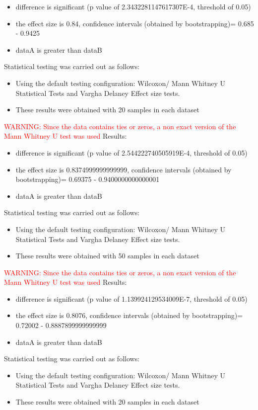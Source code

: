 \documentclass[]{article}
\begin{document}
\begin{itemize}
\item{difference is significant (p value of 2.3432281147617307E-4, threshold of 0.05)}
\item{the effect size is 0.84, confidence intervals (obtained by bootstrapping)= 0.685 - 0.9425}
\item{dataA is greater than dataB}
\end{itemize}Statistical testing was carried out as follows: \begin{itemize}
\item{Using the default testing configuration: Wilcoxon/ Mann Whitney U Statistical Tests and Vargha Delaney Effect size tests.}
\item{These results were obtained with 20 samples in each dataset}
\end{itemize}
\textcolor{Red}{WARNING: Since the data contains ties or zeros, a non exact version of the Mann Whitney U test was used}
Results:
\begin{itemize}
\item{difference is significant (p value of 2.544222740505919E-4, threshold of 0.05)}
\item{the effect size is 0.8374999999999999, confidence intervals (obtained by bootstrapping)= 0.69375 - 0.9400000000000001}
\item{dataA is greater than dataB}
\end{itemize}Statistical testing was carried out as follows: \begin{itemize}
\item{Using the default testing configuration: Wilcoxon/ Mann Whitney U Statistical Tests and Vargha Delaney Effect size tests.}
\item{These results were obtained with 50 samples in each dataset}
\end{itemize}
\textcolor{Red}{WARNING: Since the data contains ties or zeros, a non exact version of the Mann Whitney U test was used}
Results:
\begin{itemize}
\item{difference is significant (p value of 1.139924129534009E-7, threshold of 0.05)}
\item{the effect size is 0.8076, confidence intervals (obtained by bootstrapping)= 0.72002 - 0.8887899999999999}
\item{dataA is greater than dataB}
\end{itemize}Statistical testing was carried out as follows: \begin{itemize}
\item{Using the default testing configuration: Wilcoxon/ Mann Whitney U Statistical Tests and Vargha Delaney Effect size tests.}
\item{These results were obtained with 20 samples in each dataset}
\end{itemize}
\end{document}
